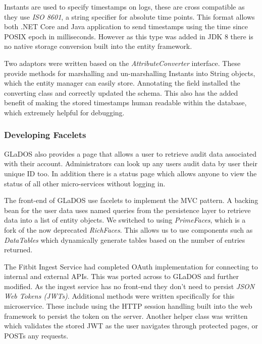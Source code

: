 \par
Instants are used to specify timestamps on logs, these are cross compatible as they use \textit{ISO 8601}, a string specifier for absolute time points. This format allows both .NET Core and Java application to send timestamps using the time since POSIX epoch in milliseconds. However as this type was added in JDK 8 there is no native storage conversion built into the entity framework.

\par
Two adaptors were written based on the \textit{AttributeConverter} interface. These provide methods for marshalling and un-marshalling Instants into String objects, which the entity manager can easily store. Annotating the field installed the converting class and correctly updated the schema. This also has the added benefit of making the stored timestamps human readable within the database, which extremely helpful for debugging.

\subsubsection{Developing Facelets}
\par
GLaDOS also provides a page that allows a user to retrieve audit data associated with their account. Administrators can look up any users audit data by user their unique ID too. In addition there is a status page which allows anyone to view the status of all other micro-services without logging in.

\par
The front-end of GLaDOS use facelets to implement the MVC pattern. A backing bean for the user data uses named queries from the persistence layer to retrieve data into a list of entity objects. We switched to using \textit{PrimeFaces}\cite{Primefaces}, which is a fork of the now deprecated \textit{RichFaces}. This allows us to use components such as \textit{DataTables} which dynamically generate tables based on the number of entries returned.

\par
The Fitbit Ingest Service had completed OAuth implementation for connecting to internal and external APIs. This was ported across to GLaDOS and further modified. As the ingest service has no front-end they don't need to persist \textit{JSON Web Tokens (JWTs)}. Additional methods were written specifically for this microservice. These include using the HTTP session handling built into the web framework to persist the token on the server. Another helper class was written which validates the stored JWT as the user navigates through protected pages, or POSTs any requests.

